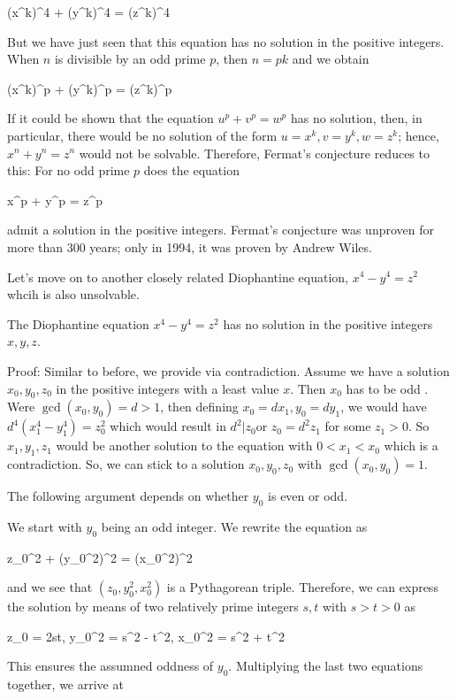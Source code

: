 \bee
(x^k)^4 + (y^k)^4 = (z^k)^4
\eee

But we have just seen that this equation has no solution in the positive integers. When $n$ is divisible by an odd prime $p$, then $n = pk$ and we obtain

\bee
(x^k)^p + (y^k)^p = (z^k)^p
\eee

If it could be shown that the equation $u^p + v^p = w^p$ has no solution, then, in particular, there would be no solution of the form $u = x^k, v = y^k, w = z^k$; hence, $x^n + y^n = z^n$ would not be solvable. Therefore, Fermat’s conjecture reduces to this: For no odd prime $p$ does the equation 

\bee
x^p + y^p = z^p
\eee

admit a solution in the positive integers. Fermat's conjecture was unproven for more than 300 years; only in 1994, it was proven by Andrew Wiles.


Let's move on to another closely related Diophantine equation, $x^4 - y^4 = z^2$ whcih is also unsolvable.

\begin{theorem}\label{2023-03-28:th4}
The Diophantine equation $x^4 - y^4 = z^2$ has no solution in the positive integers $x, y, z$.
\end{theorem}

Proof: Similar to before, we provide via contradiction. Assume we have a solution $x_0, y_0, z_0$ in the positive integers with a least value $x$. Then $x_0$ has to be odd . Were $\gcd(x_0, y_0) = d > 1$, then defining $x_0 = d x_1, y_0 = d y_1$, we would have $d^4(x_1^4 - y_1^4) = z_0^2$ which would result in $d^2 | z_0$or $z_0 = d^2 z_1$ for some $z_1 > 0$. So $x_1, y_1, z_1$ would be another solution to the equation with $0 < x_1 < x_0$ which is a contradiction. So, we can stick to a solution $x_0, y_0, z_0$ with $\gcd(x_0, y_0) = 1$.

The following argument depends on whether $y_0$ is even or odd.

We start with $y_0$ being an odd integer. We rewrite the equation as

\bee
z_0^2 + (y_0^2)^2 = (x_0^2)^2
\eee

and we see that $(z_0, y_0^2, x_0^2)$ is a Pythagorean triple. Therefore, we can express the solution by means of two relatively prime integers $s, t$ with $s > t > 0$ as

\bee
z_0 = 2st, \quad y_0^2 = s^2 - t^2, \quad x_0^2 = s^2 + t^2
\eee

This ensures the assumned oddness of $y_0$. Multiplying the last two equations together, we arrive at

